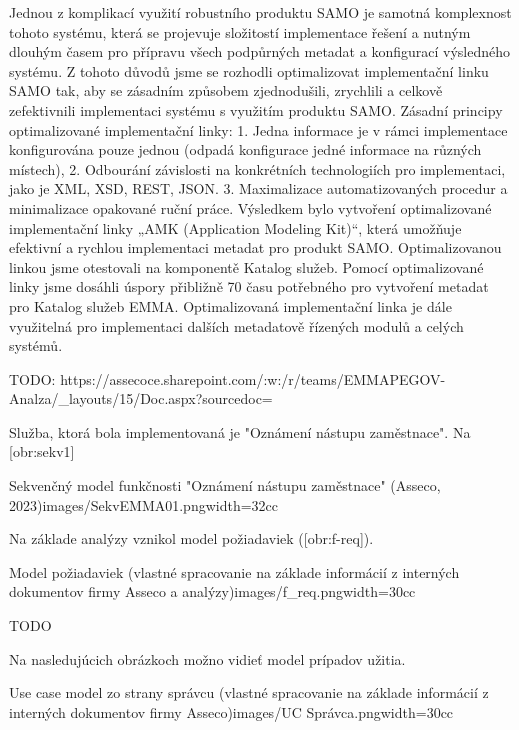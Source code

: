 Jednou z komplikací využití robustního produktu SAMO je samotná komplexnost tohoto systému, která se 
projevuje složitostí implementace řešení a nutným dlouhým časem pro přípravu všech podpůrných 
metadat a konfigurací výsledného systému. Z tohoto důvodů jsme se rozhodli optimalizovat 
implementační linku SAMO tak, aby se zásadním způsobem zjednodušili, zrychlili a celkově zefektivnili 
implementaci systému s využitím produktu SAMO. Zásadní principy optimalizované implementační linky:
1. Jedna informace je v rámci implementace konfigurována pouze jednou (odpadá konfigurace 
jedné informace na různých místech),
2. Odbourání závislosti na konkrétních technologiích pro implementaci, jako je XML, XSD, REST,
JSON.
3. Maximalizace automatizovaných procedur a minimalizace opakované ruční práce. 
Výsledkem bylo vytvoření optimalizované implementační linky „AMK (Application Modeling Kit)“, která 
umožňuje efektivní a rychlou implementaci metadat pro produkt SAMO. Optimalizovanou linkou jsme 
otestovali na komponentě Katalog služeb. Pomocí optimalizované linky jsme dosáhli úspory přibližně 70%
času potřebného pro vytvoření metadat pro Katalog služeb EMMA. Optimalizovaná implementační linka 
je dále využitelná pro implementaci dalších metadatově řízených modulů a celých systémů. 

TODO: 
https://assecoce.sharepoint.com/:w:/r/teams/EMMAPEGOV-Analza/_layouts/15/Doc.aspx?sourcedoc=%

Služba, ktorá bola implementovaná je "Oznámení nástupu zaměstnace". Na [obr:sekv1]

{Sekvenčný model funkčnosti "Oznámení nástupu zaměstnace" (Asseco, 2023)}{images/SekvEMMA01.png}{width=32cc}

Na základe analýzy vznikol model požiadaviek ([obr:f-req]).

{Model požiadaviek (vlastné spracovanie na základe informácií z interných dokumentov firmy Asseco a analýzy)}{images/f_req.png}{width=30cc}

\TODO
TODO

Na nasledujúcich obrázkoch možno vidieť model prípadov užitia.

{Use case model zo strany správcu (vlastné spracovanie na základe informácií z interných dokumentov firmy Asseco)}{images/UC Správca.png}{width=30cc}

